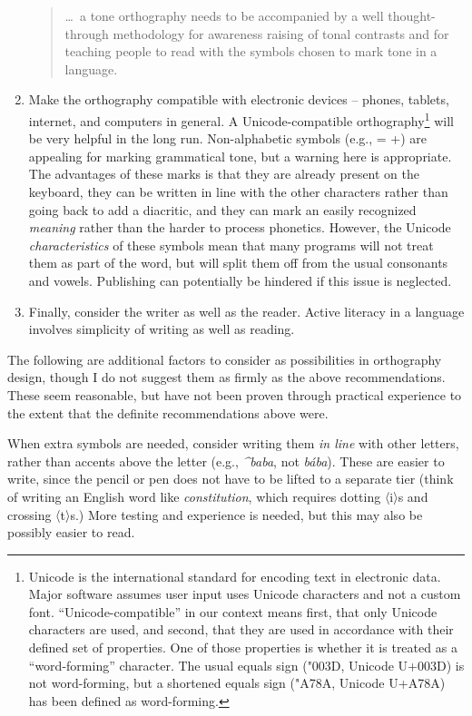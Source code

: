 \documentclass[output=paper]{langscibook}
\begin{document}
\begin{enumerate}[leftmargin=*]
\begin{quote}
\ldots\ a tone orthography needs to be accompanied by a well thought-\linebreak through methodology for awareness raising of tonal contrasts and for teaching people to read with the symbols chosen to mark tone in a language. \citep[52]{Kutsch2014}
\end{quote}\largerpage[2]

\item Make the orthography compatible with electronic devices -- phones, tablets, internet, and computers in general. A Unicode-compatible orthography\footnote{Unicode is the international standard for encoding text in electronic data. Major software assumes user input uses Unicode characters and not a custom font. “Unicode-compatible” in our context means first, that only Unicode characters are used, and second, that they are used in accordance with their defined set of properties. One of those properties is whether it is treated as a “word-forming” character. The usual equals sign ({\ttfamily\char"003D}, Unicode U+003D) is not word-forming, but a shortened equals sign ({\ttfamily\char"A78A}, Unicode U+A78A) has been defined as word-forming.}  will be very helpful in the long run. Non-alphabetic symbols (e.g., {\ttfamily * = +}) are appealing for marking grammatical tone, but a warning here is appropriate. The advantages of these marks is that they are already present on the keyboard, they can be written in line with the other characters rather than going back to add a diacritic, and they can mark an easily recognized \textit{meaning} rather than the harder to process phonetics. However, the Unicode \textit{characteristics} of these symbols mean that many programs will not treat them as part of the word, but will split them off from the usual consonants and vowels. Publishing can potentially be hindered if this issue is neglected.

\item Finally, consider the writer as well as the reader. Active literacy in a language involves simplicity of writing as well as reading.

\end{enumerate}
The following are additional factors to consider as possibilities in orthography design, though I do not suggest them as firmly as the above recommendations. These seem reasonable, but have not been proven through practical experience to the extent that the definite recommendations above were.

When extra symbols are needed, consider writing them \textit{in line} with other letters, rather than accents above the letter (e.g., \textit{\^{}}\textit{baba}, not \textit{bába}). These are easier to write, since the pencil or pen does not have to be lifted to a separate tier (think of writing an English word like \textit{constitution}, which requires dotting 〈i〉s and crossing 〈t〉s.) More testing and experience is needed, but this may also be possibly easier to read.
\end{document}
